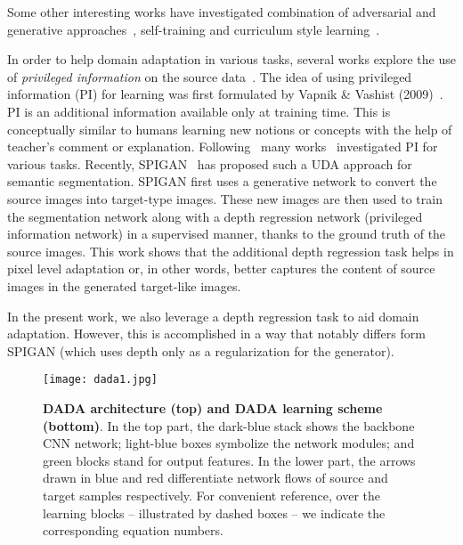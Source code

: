 \documentclass[10pt,twocolumn,letterpaper]{article}
\begin{document}
Some other interesting works have investigated combination of adversarial and generative approaches~\cite{murez2018CVPR, Sankaranarayanan_2018_CVPR, zhang2018CVPR}, self-training \cite{zou2018unsupervised}  and curriculum style learning~\cite{zhang2017curriculum}.

In order to help domain adaptation in various tasks, several works explore the use of \textit{privileged information} on the source data~\cite{chen2014recognizing, li2014exploiting, sarafianos2017adaptive}.
The idea of using privileged information (PI) for learning was first formulated by Vapnik \& Vashist (2009)~\cite{vapnik2009new}. PI is an additional information available only at training time. This is conceptually similar to humans learning new notions or concepts with the help of teacher's comment or explanation. Following~\cite{vapnik2009new} many works~\cite{hoffman2016learning, lopez2015unifying, mordan2018revisiting, Sharmanska_2013_ICCV, wang2015classifier} investigated PI for various tasks.
Recently, SPIGAN~\cite{lee2018spigan} has proposed such a UDA approach for semantic segmentation.
SPIGAN first uses a generative network to convert the source images into target-type images.
These new images are then used to train the segmentation network along with a depth regression network (privileged information network) in a supervised manner, thanks to the ground truth of the source images.
This work shows that the additional depth regression task helps in pixel level adaptation or, in other words, better captures the content of source images in the generated target-like images. 

In the present work, we also leverage a depth regression task to aid domain adaptation. However, this is accomplished in a way that notably differs form SPIGAN (which uses depth only as a regularization for the generator).

\begin{figure*}
	\centering
	\texttt{[image: dada1.jpg]}
	\vspace{-0.3cm}
	\caption{\small \textbf{DADA architecture (top) and DADA learning scheme (bottom)}. In the top part, the dark-blue stack shows the backbone CNN network; light-blue boxes symbolize the network modules; and green blocks stand for output features. In the lower part, the arrows drawn in \textcolor{scolor}{blue} and \textcolor{tcolor}{red} differentiate network flows of \textcolor{scolor}{source} and \textcolor{tcolor}{target} samples respectively. For convenient reference, over the learning blocks -- illustrated by dashed boxes -- we indicate the corresponding equation numbers.}
	\vspace{-0.3cm}
	\label{fig:dada_arch}
\end{figure*} 	
\end{document}
